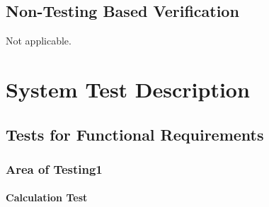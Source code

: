 \documentclass[12pt, titlepage]{article}
\begin{document}
		

\subsection{Non-Testing Based Verification}
Not applicable.

\section{System Test Description}
	
\subsection{Tests for Functional Requirements}

\subsubsection{Area of Testing1}
		
\paragraph{Calculation Test}
\end{document}

